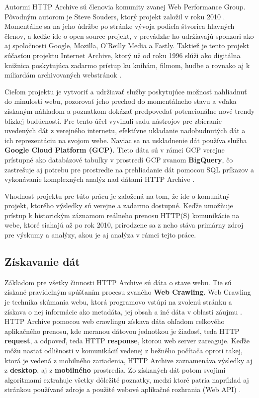 Autormi HTTP Archive sú členovia komunity zvanej Web Performance Group. Pôvodným autorom je Steve Souders, ktorý projekt založil v roku 2010 \cite{httparchive-faq}.
Momentálne sa na jeho údržbe po stránke vývoja podieľa štvorica hlavných členov, a keďže ide o open source projekt, v prevádzke ho udržiavajú sponzori ako aj spoločnosti Google, Mozilla, O'Reilly Media a Fastly.
Taktiež je tento projekt súčasťou projektu Internet Archive, ktorý už od roku 1996 slúži ako digitálna knižnica poskytujúca zadarmo prístup ku knihám, filmom, hudbe a rovnako aj k miliardám archivovaných webstránok \cite{httparchive-about}.

Cieľom projektu je vytvoriť a udržiavať služby poskytujúce možnosť nahliadnuť do minulosti webu, pozorovať jeho prechod do momentálneho stavu a vďaka získaným náhľadom a poznatkom dokázať
predpovedať potencionálne nové trendy blízkej budúcnosti. 
Pre tento účel vyvinuli sadu nástrojov pre zbieranie uvedených dát z verejného internetu, efektívne ukladanie nadobudnutých dát a ich reprezentáciu na svojom webe.
Naviac sa na uskladnenie dát používa služba \textbf{Google Cloud Platform (GCP)}.
Tieto dáta sú v rámci GCP verejne prístupné ako databázové tabuľky v prostredí GCP zvanom \textbf{BigQuery}, čo zastrešuje aj potrebu pre prostredie na prehliadanie dát pomocou SQL príkazov 
a vykonávanie komplexných analýz nad dátami HTTP Archive \cite{httparchive-faq}. 

\pagebreak

Vhodnosť projektu pre túto prácu je založená na tom, že ide o komunitný projekt, ktorého výsledky sú verejne a zadarmo dostupné. Keďže umožňuje prístup k historickým záznamom reálneho prenosu HTTP(S) komunikácie na webe, ktoré siahajú až po rok 2010, prirodzene sa z neho stáva primárny zdroj pre výskumy a analýzy, akou je aj analýza v rámci tejto práce.


\subsection{Získavanie dát}
\label{fetching-data}

Základom pre všetky činnosti HTTP Archive sú dáta o stave webu. Tie sú získané pravidelným spúšťaním procesu zvaného \textbf{Web Crawling}.
Web Crawling je technika skúmania webu, ktorá programovo vstúpi na zvolenú stránku a získava o nej informácie ako metadáta, jej obsah a iné dáta v oblasti záujmu \cite{httparchive-webcrawling}.
HTTP Archive pomocou web crawlingu získava dáta ohľadom celkového aplikačného prenosu, kde meranou dátovou jednotkou je žiadosť, teda HTTP \textbf{request}, a odpoveď, teda HTTP \textbf{response}, ktorou web server zareaguje. 
Keďže môžu nastať odlišnosti v komunikácií vedenej z bežného počítača oproti takej, ktorá je vedená z mobilného zariadenia, HTTP Archive zaznamenáva výsledky aj z \textbf{desktop}, aj z \textbf{mobilného} prostredia.
Zo získaných dát potom svojimi algoritmami extrahuje všetky dôležité poznatky, medzi ktoré patria napríklad aj stránkou používané zdroje a použité webové aplikačné rozhrania (Web API) \cite{httparchive-homepage}.

